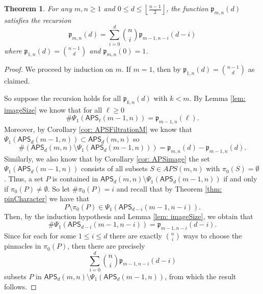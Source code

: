 \documentclass[12pt,reqno]{amsart}
\numberwithin{equation}{section}
\theoremstyle{plain}
\newtheorem{theorem}{Theorem}[section]
\theoremstyle{definition}
\theoremstyle{remark}
\newcommand{\p}{\mathfrak{p}}
\newcommand\APS{\mathsf{APS}}
\newcommand{\floor}[1]{\left\lfloor#1\right\rfloor}
\begin{document}
\begin{theorem}\label{thm:recursion}
For any $m,n\geq 1$ and $0 \leq d \leq \floor{\frac{n-1}{2}}$,
the function $\p_{m,n}(d)$ satisfies the recursion
\[
\p_{m, n}(d) =\sum_{i=0}^d\binom{n}{i}\p_{m-1, n-i}(d-i)
\]
where 
$\p_{1, n}(d)=\binom{n-1}{d}$
and $\p_{m,n}(0)=1$.
\end{theorem}
\begin{proof}
We proceed by induction on $m$. If $m=1$, then by \cite[Proposition 3.11]{PinSignedPermutations} $\p_{1,n}(d) =\binom{n-1}{d}$ as claimed. 

So suppose the recursion holds for all $\p_{k,n}(d)$ with $k<m$. By Lemma \ref{lem: imageSize} we know that for all $\ell\geq 0$ 
\[ \# \Psi_1(\APS_\ell(m-1,n))=\p_{m-1,n}(\ell).\]
Moreover, by Corollary \ref{cor: APSFiltrationM} we know that $\Psi_1(\APS_d(m-1,n)) \subset \APS_d(m,n)$ so 
\[\#(\APS_d(m,n)\setminus \Psi_1(\APS_d(m-1,n))) = \p_{m,n}(d) - \p_{m-1,n}(d).\]
Similarly, we also know that by Corollary \ref{cor: APSimage} the set $\Psi_1(\APS_d(m-1,n))$ consists of all subsets $S \in APS(m,n)$ with $\pi_0(S) = \emptyset$. Thus, a set $P$ is contained in $\APS_d(m,n)\setminus \Psi_1(\APS_d(m-1,n))$ if and only if $\pi_0(P) \neq \emptyset$. So let $\#\pi_0(P)=i$ and recall that by Theorem \ref{thm: pinCharacter} we have that 
\[P\setminus \pi_0(P) \in \Psi_1\left(\APS_{d-i}(m-1,n-i)\right).\]
Then, by the induction hypothesis and Lemma \ref{lem: imageSize}, we obtain that
\[
\# \Psi_1(\APS_{d-i}(m-1,n-i)) = \p_{m-1,n-i}(d-i).
\]
Since for each for some $1\leq i \leq d$ there are exactly $\binom{n}{i}$ ways to choose the pinnacles in $\pi_0(P)$, then there are precisely
\[
 \sum_{i=0}^d\binom{n}{i}\p_{m-1, n-i}(d-i)
\]
subsets $P$ in $\APS_d(m,n)\setminus \Psi_1(\APS_d(m-1,n))$, from which the result follows.
 \end{proof}
\end{document}
